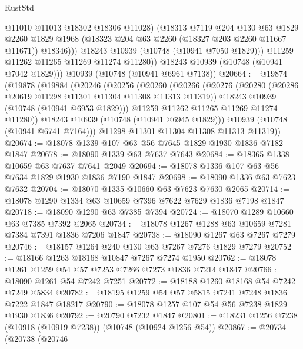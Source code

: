 \begin{lexlean}{RustStd}
\begin{coremodule}
{\begin{coremodule}
{{{{{                  @11010
                  @11013
                  @18302
                  @18306
                  @11028)
                (@18313
                  @7119
                  @204
                  @130
                  @63
                  @1829
                  @2260
                  @1829
                  @1968
                  (@18323 @204 @63 @2260 (@18327 @203 @2260 @11667 @11671))
                  @18346)))
            @18243
            @10939
            (@10748 (@10941 @7050 @1829)))
          @11259
          @11262
          @11265
          @11269
          @11274
          @11280))
      @18243
      @10939
      (@10748 (@10941 @7042 @1829)))
    @10939
    (@10748 (@10941 @6961 @7138))
@20664 := @19874
    (@19878
      (@19884
        (@20246
          (@20256
            (@20260
              (@20266
                (@20276
                  (@20280 (@20286 @20619 @11298 @11301 @11304 @11308 @11313 @11319))
                  @18243
                  @10939
                  (@10748 (@10941 @6953 @1829)))
                @11259
                @11262
                @11265
                @11269
                @11274
                @11280))
            @18243
            @10939
            (@10748 (@10941 @6945 @1829)))
          @10939
          (@10748 (@10941 @6741 @7164)))
        @11298
        @11301
        @11304
        @11308
        @11313
        @11319))
@20674 := @18078 @1339 @107 @63 @56 @7645 @1829 @1930 @1836 @7182 @1847
@20678 := @18090 @1339 @63 @7637 @7643
@20684 := @18365 @1338 @10659 @63 @7637 @7641 @2049
@20694 := @18078 @1336 @107 @63 @56 @7634 @1829 @1930 @1836 @7190 @1847
@20698 := @18090 @1336 @63 @7623 @7632
@20704 := @18070 @1335 @10660 @63 @7623 @7630 @2065
@20714 := @18078 @1290 @1334 @63 @10659 @7396 @7622 @7629 @1836 @7198 @1847
@20718 := @18090 @1290 @63 @7385 @7394
@20724 := @18070 @1289 @10660 @63 @7385 @7392 @2065
@20734 := @18078 @1267 @1288 @63 @10659 @7281 @7384 @7391 @1836 @7206 @1847
@20738 := @18090 @1267 @63 @7267 @7279
@20746 := @18157 @1264 @240 @130 @63 @7267 @7276 @1829 @7279
@20752 := @18166 @1263 @18168 @10847 @7267 @7274 @1950
@20762 := @18078 @1261 @1259 @54 @57 @7253 @7266 @7273 @1836 @7214 @1847
@20766 := @18090 @1261 @54 @7242 @7251
@20772 := @18188 @1260 @18168 @54 @7242 @7249 @5834
@20782 := @18195 @1259 @54 @57 @5815 @7241 @7248 @1836 @7222 @1847 @18217
@20790 := @18078 @1257 @107 @54 @56 @7238 @1829 @1930 @1836
@20792 := @20790 @7232 @1847
@20801 := @18231 @1256 @7238 (@10918 (@10919 @7238)) (@10748 (@10924 @1256 @54))
@20867 := @20734
    (@20738
      (@20746
}}}}}
\end{coremodule}}
\end{coremodule}
\end{lexlean}
